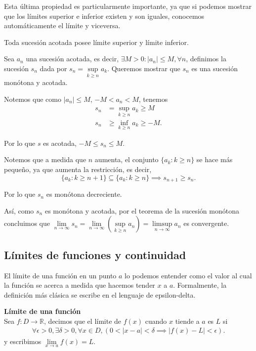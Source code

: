 \documentclass[12pt]{book}
\begin{document}
Esta última propiedad es particularmente importante, ya que si podemos mostrar que los límites superior e inferior existen y son iguales, conocemos automáticamente el límite y viceversa.

\begin{theoremenv}
    Toda sucesión acotada posee límite superior y límite inferior.
\end{theoremenv}

\begin{proofenv}

Sea $a_n$ una sucesión acotada, es decir, $\exists M>0:|a_n|\leq M, \forall n$, definimos la sucesión $s_n$ dada por $s_n=\sup\limits_{k\ge n} a_k$. Queremos mostrar que $s_n$ es una sucesión monótona y acotada. 

Notemos que como $|a_n|\leq M$, $-M<a_n<M$, tenemos
\begin{align*}
    s_n&=\sup\limits_{k\ge n} a_k \ge M\\
    s_n&\ge \inf\limits_{k\ge n}a_k\ge-M.
\end{align*}

Por lo que $s$ es acotada, $-M\leq s_n\leq M$.

Notemos que a medida que $n$ aumenta, el conjunto $\{a_k:k\ge n\}$ se hace más pequeño, ya que aumenta la restricción, es decir,
\[
    \{a_k:k\ge n+1\}\subseteq \{a_k:k\ge n\}\implies s_{n+1}\ge s_n.
\]

Por lo que $s_n$ es monótona decreciente.

Así, como $s_n$ es monótona y acotada, por el teorema de la sucesión monótona concluimos que $\lim\limits_{n\to\infty}s_n=\lim\limits_{n\to\infty}(\sup\limits_{k\ge n} a_n)=\limsup\limits_{n\to \infty}a_n$ es convergente.
\end{proofenv}

\subsection{Límites de funciones y continuidad}
\noindent
El límite de una función en un punto $a$ lo podemos entender como el valor al cual la función se acerca a medida que hacemos tender $x$ a $a$. Formalmente, la definición más clásica se escribe en el lenguaje de epsilon-delta.

\begin{definitionenv}\label{def:limit_1}
    \textbf{Límite de una función}\\
    Sea $f:D\to \mathbb{R}$, decimos que el límite de $f(x)$ cuando $x$ tiende a $a$ es $L$ si
    \begin{align*}
        \forall \epsilon >0, \exists \delta>0,\forall x\in D,(0<|x-a|<\delta\implies |f(x)-L|<\epsilon).
    \end{align*}
    y escribimos $\lim\limits_{x\to a}f(x)=L$.
\end{definitionenv}
\end{document}
